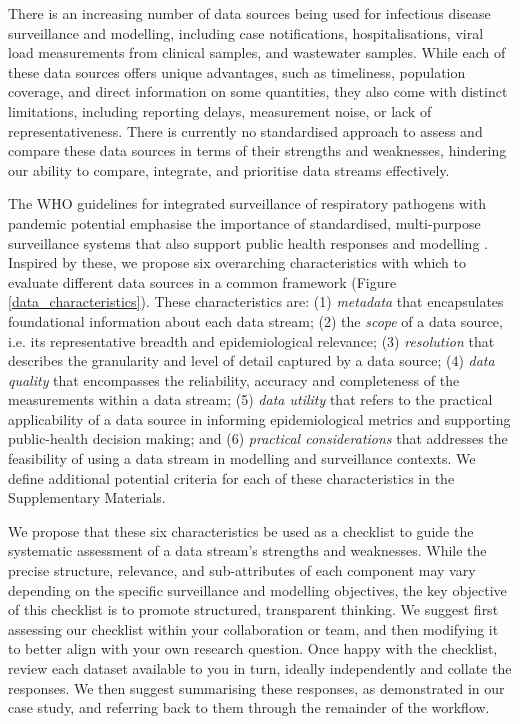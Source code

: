 \documentclass{article}
\begin{document}
There is an increasing number of data sources being used for infectious disease surveillance and modelling, including case notifications, hospitalisations, viral load measurements from clinical samples, and wastewater samples. While each of these data sources offers unique advantages, such as timeliness, population coverage, and direct information on some quantities, they also come with distinct limitations, including reporting delays,  measurement noise, or lack of representativeness. There is currently no standardised approach to assess and compare these data sources in terms of their strengths and weaknesses, hindering our ability to compare, integrate, and prioritise data streams effectively. 

The WHO guidelines for integrated surveillance of respiratory pathogens with pandemic potential emphasise the importance of standardised, multi-purpose surveillance systems that also support public health responses and modelling \citep{world2024implementing}. Inspired by these, we propose six overarching characteristics with which to evaluate different data sources in a common framework (Figure \ref{data_characteristics}).  These characteristics are: (1) \textit{metadata}  that encapsulates foundational information about each data stream; (2) the \textit{scope} of a data source, i.e. its representative breadth and epidemiological relevance; (3) \textit{resolution} that describes the granularity and level of detail captured by a data source; (4) \textit{data quality} that encompasses the reliability, accuracy and completeness of the measurements within a data stream; (5) \textit{data utility} that refers to the practical applicability of a data source in informing epidemiological metrics and supporting public-health decision making; and (6)\textit{ practical considerations} that addresses the feasibility of using a data stream in modelling and surveillance contexts. We define additional potential criteria for each of these characteristics in the Supplementary Materials. 

We propose that these six characteristics be used as a checklist to guide the systematic assessment of a data stream's strengths and weaknesses. While the precise structure, relevance, and sub-attributes of each component may vary depending on the specific surveillance and modelling objectives, the key objective of this checklist is to promote structured, transparent thinking. We suggest first assessing our checklist within your collaboration or team,  and then modifying it to better align with your own research question. Once happy with the checklist, review each dataset available to you in turn, ideally independently and collate the responses. We then suggest summarising these responses, as demonstrated in our case study, and referring back to them through the remainder of the workflow.
\end{document}
